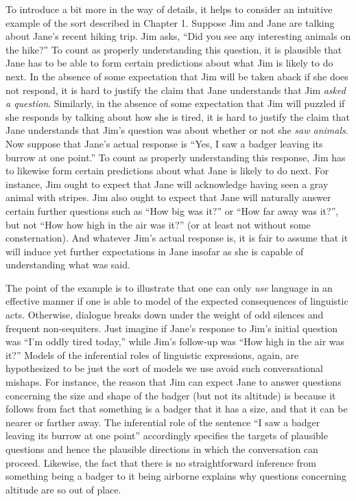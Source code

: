 To introduce a bit more in the way of details, it helps to consider an intuitive example of the sort described in Chapter 1. Suppose Jim and Jane are talking about Jane's recent hiking trip. Jim asks, ``Did you see any interesting animals on the hike?'' To count as properly understanding this question, it is plausible that Jane has to be able to form certain predictions about what Jim is likely to do next. In the absence of some expectation that Jim will be taken aback if she does not respond, it is hard to justify the claim that Jane understands that Jim \textit{asked a question}. Similarly, in the absence of some expectation that Jim will puzzled if she responds by talking about how she is tired, it is hard to justify the claim that Jane understands that Jim's question was about whether or not she \textit{saw animals}. Now suppose that Jane's actual response is ``Yes, I saw a badger leaving its burrow at one point.'' To count as properly understanding this response, Jim has to likewise form certain predictions about what Jane is likely to do next. For instance, Jim ought to expect that Jane will acknowledge having seen a gray animal with stripes. Jim also ought to expect that Jane will naturally answer certain further questions such as ``How big was it?'' or ``How far away was it?'', but not ``How how high in the air was it?'' (or at least not without some consternation). And whatever Jim's actual response is, it is fair to assume that it will induce yet further expectations in Jane insofar as she is capable of understanding what was said. 

The point of the example is to illustrate that one can only \textit{use} language in an effective manner if one is able to model of the expected consequences of linguistic acts. Otherwise, dialogue breaks down under the weight of odd silences and frequent non-sequiters. Just imagine if Jane's response to Jim's initial question was ``I'm oddly tired today,'' while Jim's follow-up was ``How high in the air was it?'' Models of the inferential roles of linguistic expressions, again, are hypothesized to be just the sort of models we use avoid such conversational mishaps. For instance, the reason that Jim can expect Jane to answer questions concerning the size and shape of the badger (but not its altitude) is because it follows from fact that something is a badger that it has a size, and that it can be nearer or farther away. The inferential role of the sentence ``I saw a badger leaving its burrow at one point'' accordingly specifies the targets of plausible questions and hence the plausible directions in which the conversation can proceed. Likewise, the fact that there is no straightforward inference from something being a badger to it being airborne explains why questions concerning altitude are so out of place.

